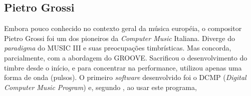 
\subsection{Pietro Grossi}\label{sec:grossi}

Embora pouco conhecido no contexto geral da música européia, o compositor Pietro Grossi foi  um dos pioneiros da \emph{Computer Music} Italiana. Diverge do \emph{paradigma} do MUSIC III e suas preocupações timbrísticas. Mas concorda, parcialmente, com a abordagem do GROOVE. Sacrificou o desenvolvimento do timbre desde o início, e para concentrar na performance, utilizou apenas uma forma de onda (pulsos). O primeiro \emph{software} desenvolvido foi o DCMP (\emph{Digital Computer Music Program}) e, segundo \cite{mori_pietro_2015}, ao usar este programa,

